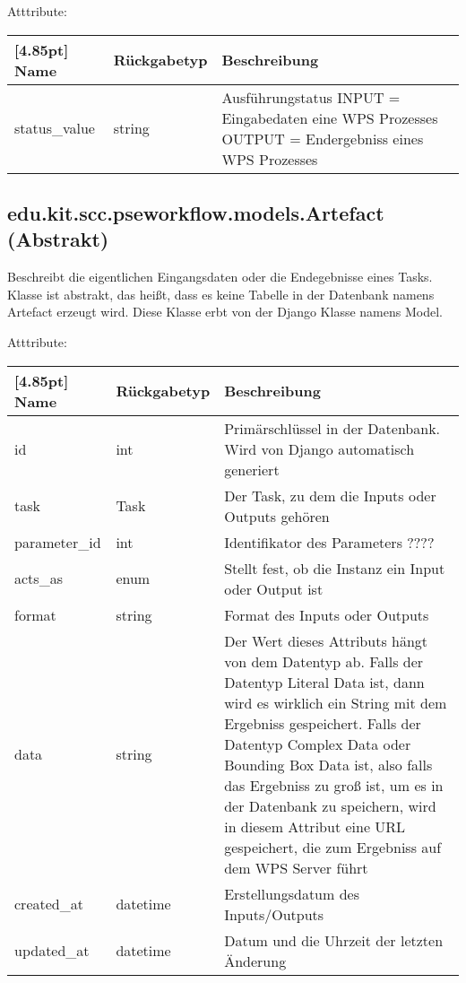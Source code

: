 			Atttribute:
			\begin{center}
				\setlength\tabcolsep{5pt}
				\renewcommand{\arraystretch}{1.5}
				
				\begin{tabularx}{\textwidth}{|l|l|X|}
					\hline
					\rowcolor[gray]{0.75}[4.85pt]
					Name & Rückgabetyp & Beschreibung \\ \hline 
	           		status\_value & string & Ausführungstatus\newline
	           		INPUT = Eingabedaten eine WPS Prozesses \newline
	           		OUTPUT = Endergebniss eines WPS Prozesses \\ \hline
				\end{tabularx}
			\end{center}
        \subsection{edu.kit.scc.pseworkflow.models.Artefact (Abstrakt)}
			Beschreibt die eigentlichen Eingangsdaten oder die Endegebnisse eines Tasks. Klasse ist abstrakt, das heißt, dass es keine Tabelle in der Datenbank namens \glqq Artefact \grqq erzeugt wird. \newline 
			Diese Klasse erbt von der Django Klasse namens \glqq Model\grqq .
			
			Atttribute:
			\begin{center}
				\setlength\tabcolsep{5pt}
				\renewcommand{\arraystretch}{1.5}
				
				\begin{tabularx}{\textwidth}{|l|l|X|}
					\hline
					\rowcolor[gray]{0.75}[4.85pt]
					Name & Rückgabetyp & Beschreibung \\ \hline 
					id & int & Primärschlüssel in der Datenbank. Wird von Django automatisch generiert \\ \hline
					task & Task & Der Task, zu dem die Inputs oder Outputs gehören\\ \hline
					parameter\_id & int & Identifikator des Parameters ???? \\ \hline
					acts_as & enum & Stellt fest, ob die Instanz ein Input oder Output ist \\ \hline
					format & string & Format des Inputs oder Outputs \\ \hline
					data & string & Der Wert dieses Attributs hängt von dem Datentyp ab. Falls der Datentyp Literal Data ist, dann wird es wirklich ein String mit dem Ergebniss gespeichert. Falls der Datentyp Complex Data oder Bounding Box Data ist, also falls das Ergebniss zu groß ist, um es in der Datenbank zu speichern, wird in diesem Attribut eine URL gespeichert, die zum Ergebniss auf dem WPS Server führt \\ \hline
					created\_at & datetime & Erstellungsdatum des Inputs/Outputs \\ \hline
					updated\_at & datetime & Datum und die Uhrzeit der letzten Änderung \\ \hline
				\end{tabularx}
			\end{center}
			
